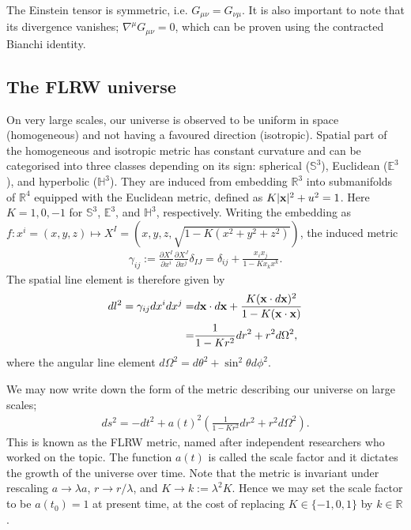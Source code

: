 The Einstein tensor is symmetric, i.e. $G_{\mu\nu} = G_{\nu\mu}$. It is also important to note that its divergence vanishes; $\nabla^\mu G_{\mu\nu} = 0$, which can be proven using the contracted Bianchi identity.


\subsection{The FLRW universe}
On very large scales, our universe is observed to be uniform in space (homogeneous) and not having a favoured direction (isotropic). Spatial part of the homogeneous and isotropic metric has constant curvature and can be categorised into three classes depending on its sign: spherical ($\mathbb{S}^3$), Euclidean ($\mathbb{E}^3$), and hyperbolic ($\mathbb{H}^3$). They are induced from embedding $\mathbb{R}^3$ into submanifolds of $\mathbb{R}^4$ equipped with the Euclidean metric, defined as $K|\mathbf{x}|^2 + u^2 = 1$. Here $K=1,0,-1$ for $\mathbb{S}^3$, $\mathbb{E}^3$, and $\mathbb{H}^3$, respectively. Writing the embedding as $f: x^i = (x,y,z) \mapsto X^I =(x,y,z,\sqrt{1-K(x^2+y^2+z^2)})$, the induced metric
\begin{align}
	\gamma_{ij} := \frac{\partial X^I}{\partial x^i} \frac{\partial X^J}{\partial x^j} \delta_{IJ}
	= \delta_{ij} + \frac{x_i x_j}{1-Kx_k x^k}. \label{eqn:FLRW_metric_spatial}
\end{align}
The spatial line element is therefore given by
\begin{align}
	dl^2 = \gamma_{ij} dx^i dx^j =& d\mathbf{x} \cdot d\mathbf{x} + \frac{K(\mathbf{x} \cdot d\mathbf{x})^2}{1-K (\mathbf{x} \cdot \mathbf{x})} \\
	=& \frac{1}{1-Kr^2} dr^2 + r^2 d\Omega^2,
\end{align}
where the angular line element $d\Omega^2 = d\theta^2 + \sin^2\theta d\phi^2$.

We may now write down the form of the metric describing our universe on large scales;
\begin{align}
	ds^2 = - dt^2 + a(t)^2 \left( \frac{1}{1-Kr^2} dr^2 + r^2 d\Omega^2 \right).
\end{align}
This is known as the FLRW metric, named after independent researchers who worked on the topic. The function $a(t)$ is called the scale factor and it dictates the growth of the universe over time. Note that the metric is invariant under rescaling $a \rightarrow \lambda a$, $r \rightarrow r / \lambda$, and $K \rightarrow k:= \lambda^2 K$. Hence we may set the scale factor to be $a(t_0) = 1$ at present time, at the cost of replacing $K \in \{-1,0,1\}$ by $k \in \mathbb{R}$.

